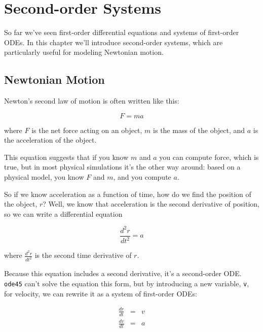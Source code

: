 \chapter{Second-order Systems}
\minitoc{}

So far we've seen first-order differential equations and systems of first-order ODEs.  In this chapter we'll introduce second-order systems, which are particularly useful for modeling Newtonian motion.


\section{Newtonian Motion}

Newton's second law of motion is often written like this:

\begin{equation}
    F = m a
\end{equation}

where $F$ is the net force acting on an object, $m$ is the
mass of the object, and $a$ is the acceleration of the object.

This equation suggests
that if you know $m$ and $a$ you can compute force, which is true,
but in most physical simulations it's the other way around:  based on a
physical model, you know $F$ and $m$, and you compute $a$.


So if we know acceleration as a function of time, how do we
find the position of the object, $r$?  Well, we know that acceleration
is the second derivative of position, so we can write a differential
equation

\begin{equation}
    \frac{d^2r}{dt^2} = a
\end{equation}

where $\frac{d^2r}{dt^2}$ is the second time derivative of $r$.

Because this equation includes a second derivative, it's
a second-order ODE.  {\tt ode45} can't solve the equation this form, but
by introducing a new variable, {\tt v}, for velocity, we can rewrite it
as a system of first-order ODEs:

\begin{eqnarray}
    \frac{dr}{dt} &=& v   \\
    \frac{dv}{dt} &=& a
\end{eqnarray}

